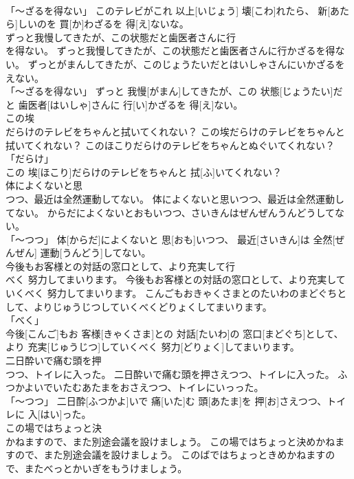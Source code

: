 \documentclass[8pt]{extreport}
\begin{document}
\begin{CJK}{UTF8}{min}
\\	「～ざるを得ない」	このテレビがこれ 以上[いじょう] 壊[こわ]れたら、 新[あたら]しいのを 買[か]わざるを 得[え]ないな。		
\\	ずっと我慢してきたが、この状態だと歯医者さんに行
\\	を得ない。	ずっと我慢してきたが、この状態だと歯医者さんに行かざるを得ない。	ずっとがまんしてきたが、このじょうたいだとはいしゃさんにいかざるをえない。	
\\	「～ざるを得ない」	ずっと 我慢[がまん]してきたが、この 状態[じょうたい]だと 歯医者[はいしゃ]さんに 行[い]かざるを 得[え]ない。		
\\	この埃
\\	だらけのテレビをちゃんと拭いてくれない？	この埃だらけのテレビをちゃんと拭いてくれない？	このほこりだらけのテレビをちゃんとぬぐいてくれない？	
\\	「だらけ」 
\\	この 埃[ほこり]だらけのテレビをちゃんと 拭[ふ]いてくれない？		
\\	体によくないと思
\\	つつ、最近は全然運動してない。	体によくないと思いつつ、最近は全然運動してない。	からだによくないとおもいつつ、さいきんはぜんぜんうんどうしてない。	
\\	「～つつ」	体[からだ]によくないと 思[おも]いつつ、 最近[さいきん]は 全然[ぜんぜん] 運動[うんどう]してない。		
\\	今後もお客様との対話の窓口として、より充実して行
\\	べく 努力してまいります。	今後もお客様との対話の窓口として、より充実していくべく 努力してまいります。	こんごもおきゃくさまとのたいわのまどぐちとして、よりじゅうじつしていくべくどりょくしてまいります。	
\\	「べく」 
\\	今後[こんご]もお 客様[きゃくさま]との 対話[たいわ]の 窓口[まどぐち]として、より 充実[じゅうじつ]していくべく 努力[どりょく]してまいります。		
\\	二日酔いで痛む頭を押
\\	つつ、トイレに入った。	二日酔いで痛む頭を押さえつつ、トイレに入った。	ふつかよいでいたむあたまをおさえつつ、トイレにいっった。	
\\	「～つつ」	二日酔[ふつかよ]いで 痛[いた]む 頭[あたま]を 押[お]さえつつ、トイレに 入[はい]った。		
\\	この場ではちょっと決
\\	かねますので、また別途会議を設けましょう。	この場ではちょっと決めかねますので、また別途会議を設けましょう。	このばではちょっときめかねますので、またべっとかいぎをもうけましょう。	

\end{CJK}
\end{document}
